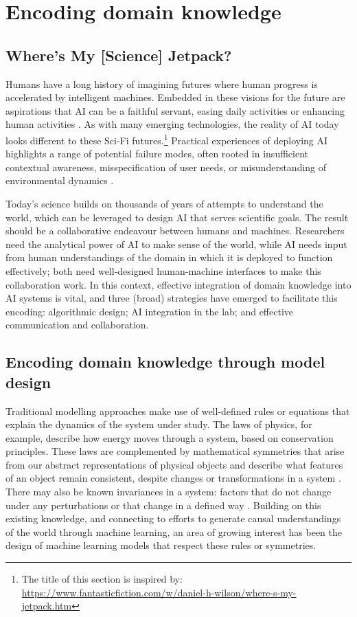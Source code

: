 \section{Encoding domain knowledge}\label{encoding-domain-knowledge}

\subsection{Where's My {[}Science{]} Jetpack?}\label{wheres-my-science-jetpack}

Humans have a long history of imagining futures where human progress is
accelerated by intelligent machines. Embedded in these visions for the
future are aspirations that AI can be a faithful servant, easing daily
activities or enhancing human activities \cite{Royal-narratives18}.
As with many emerging technologies, the reality of AI today looks
different to these Sci-Fi futures.\footnote{The title of this section is
  inspired by:
  \url{https://www.fantasticfiction.com/w/daniel-h-wilson/where-s-my-jetpack.htm}}
Practical experiences of deploying AI highlights a range of potential
failure modes, often rooted in insufficient contextual awareness,
misspecification of user needs, or misunderstanding of environmental
dynamics \cite{Paleyes-challenges22}.

Today's science builds on thousands of years of attempts to understand
the world, which can be leveraged to design AI that serves scientific
goals. The result should be a collaborative endeavour between humans and
machines. Researchers need the analytical power of AI to make sense of
the world, while AI needs input from human understandings of the domain
in which it is deployed to function effectively; both need well-designed
human-machine interfaces to make this collaboration work. In this
context, effective integration of domain knowledge into AI systems is
vital, and three (broad) strategies have emerged to facilitate this
encoding: algorithmic design; AI integration in the lab; and effective
communication and collaboration.

\subsection{Encoding domain knowledge through model
design}\label{encoding-domain-knowledge-through-model-design}

Traditional modelling approaches make use of well-defined rules or
equations that explain the dynamics of the system under study. The laws
of physics, for example, describe how energy moves through a system,
based on conservation principles. These laws are complemented by
mathematical symmetries that arise from our abstract representations of
physical objects and describe what features of an object remain
consistent, despite changes or transformations in a system \cite{Villar-scalars21}.
There may also be known invariances in a system: factors that do not
change under any perturbations or that change in a defined
way \cite{Ling-machine16}.
Building on this existing knowledge, and connecting to efforts to
generate causal understandings of the world through machine learning, an
area of growing interest has been the design of machine learning models
that respect these rules or symmetries.

